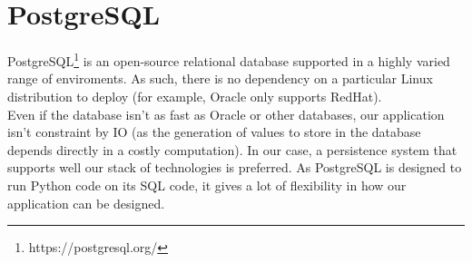 \section{PostgreSQL}

PostgreSQL\footnote{https://postgresql.org/} is an open-source relational
database supported in a highly varied range of enviroments. As such, there is no
dependency on a particular Linux distribution to deploy (for example, Oracle only
supports RedHat).\\

Even if the database isn't as fast as Oracle or other databases, our
application isn't constraint by IO (as the generation of values to store in the
database depends directly in a costly computation). In our case, a persistence
system that supports well our stack of technologies is preferred. As
PostgreSQL is designed to run Python code on its SQL code, it gives a lot
of flexibility in how our application can be designed.
